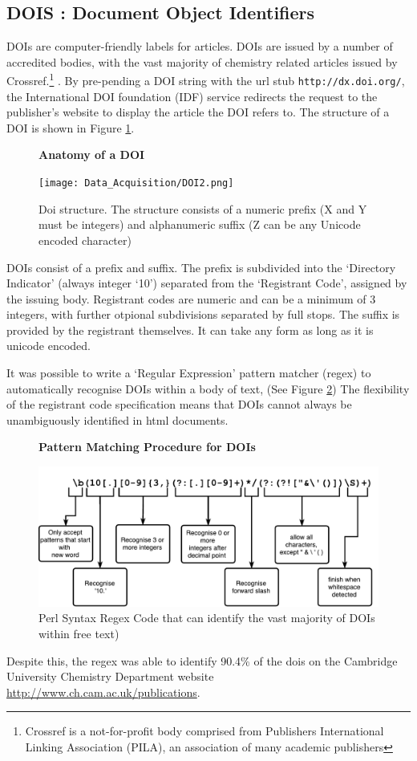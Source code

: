 \subsection{DOIS : Document Object Identifiers}
\label{sec:DOI}
DOIs are computer-friendly labels for articles. DOIs are issued by a number of accredited bodies, with the vast majority of chemistry related articles issued by Crossref.\footnote{Crossref is a not-for-profit body comprised from Publishers International Linking Association (PILA), an association of many academic publishers} \cite{crossref-formation}. By pre-pending a DOI string with the url stub \texttt{http://dx.doi.org/}, the International DOI foundation (IDF) service redirects the request to the publisher's website to display the article the DOI refers to. The structure of a DOI is shown in Figure \ref{fig:DOI}.
\begin{figure}[H]
    \centering
    \textbf{Anatomy of a DOI}\par\medskip
    \texttt{[image: Data\_Acquisition/DOI2.png]}
    \caption[Anatomy of a DOI]{Doi structure. The structure consists of a numeric prefix (X and Y must be integers) and alphanumeric suffix (Z can be any Unicode encoded character) \label{fig:DOI}}
\end{figure}
DOIs consist of a prefix and suffix. The prefix is subdivided into the ‘Directory Indicator’ (always integer ‘10’) separated from the ‘Registrant Code’, assigned by the issuing body. Registrant codes are numeric and can be a minimum of 3 integers, with further otpional subdivisions separated by full stops. The suffix is provided by the registrant themselves. It can take any form as long as it is unicode encoded.


It was possible to write a `Regular Expression' pattern matcher (regex) to automatically recognise DOIs within a body of text, (See Figure \ref{fig:REGEX}) The flexibility of the registrant code specification means that DOIs cannot always be unambiguously identified in html documents. 
\begin{figure}[H]
    \centering
    \textbf{Pattern Matching Procedure for DOIs}\par\medskip
    \includegraphics[width=\textwidth]{Data_Acquisition/Regex.pdf}
    \caption[Pattern Matching Procdure for DOIs]{Perl Syntax Regex Code that can identify the vast majority of DOIs within free text) \label{fig:REGEX}}
\end{figure}
Despite this, the regex was able to identify 90.4\% of the dois on the Cambridge University Chemistry Department website \url{http://www.ch.cam.ac.uk/publications}. 
